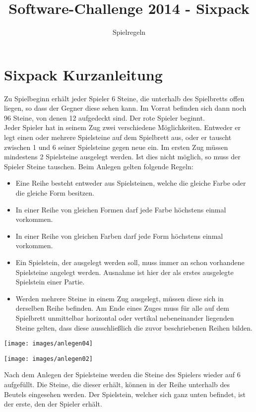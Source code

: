 \documentclass[a4paper, ngerman]{scrartcl}
\title{Software-Challenge 2014 - Sixpack}
\subtitle{Spielregeln}
\begin{document}
\section*{Sixpack Kurzanleitung} Zu Spielbeginn erhält jeder Spieler 6
Steine, die unterhalb des Spielbretts offen liegen, so dass der Gegner diese sehen kann.
Im Vorrat befinden sich dann noch 96 Steine, von denen 12 aufgedeckt sind. Der
rote Spieler beginnt.\\
 Jeder Spieler hat in seinem Zug zwei verschiedene Möglichkeiten. Entweder er
 legt einen oder mehrere Spielsteine auf dem Spielbrett aus, oder er tauscht
 zwischen 1 und 6 seiner Spielsteine gegen neue ein. Im ersten Zug müssen
 mindestens 2 Spielsteine ausgelegt werden. Ist dies nicht möglich, so muss der
 Spieler Steine tauschen.
Beim Anlegen gelten folgende Regeln:
\begin{itemize}
\item Eine Reihe besteht entweder aus Spielsteinen, welche die gleiche Farbe oder die gleiche Form besitzen.
\item In einer Reihe von gleichen Formen darf jede Farbe höchstens einmal vorkommen.
\item In einer Reihe von gleichen Farben darf jede Form höchstens einmal vorkommen.
\item Ein Spielstein, der ausgelegt werden soll, muss immer an schon vorhandene Spielsteine angelegt werden. Ausnahme ist hier der als erstes ausgelegte Spielstein einer Partie.
\item Werden mehrere Steine in einem Zug ausgelegt, müssen diese sich in derselben Reihe befinden. Am Ende eines Zuges muss für alle auf dem Spielbrett unmittelbar horizontal oder vertikal nebeneinander liegenden Steine gelten, dass diese ausschließlich die zuvor beschriebenen Reihen bilden.
\end{itemize}
\begin{minipage}[c]{0.4\textwidth}
	\centering
	\texttt{[image: images/anlegen04]}
\end{minipage}
\begin{minipage}[c]{0.4\textwidth}
	\centering
	\texttt{[image: images/anlegen02]}
\end{minipage}

Nach dem Anlegen der Spielsteine werden die Steine des Spielers wieder auf 6
aufgefüllt. Die Steine, die dieser erhält, können in der Reihe unterhalb des
Beutels eingesehen werden. Der Spielstein, welcher sich ganz unten befindet, ist der erste, den der Spieler erhält.\\
\end{document}
